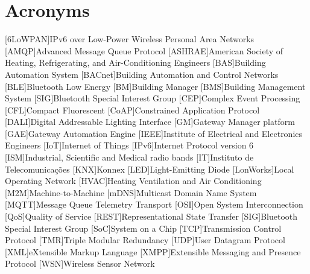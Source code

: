 \chapter{Acronyms}

\footnotesize
\SingleSpacing

\begin{multicols}{2}
\begin{acronym}[AAAAAA]
	[6LoWPAN]{IPv6 over Low-Power Wireless Personal Area Networks}
	[AMQP]{Advanced Message Queue Protocol}
	[ASHRAE]{American Society of Heating, Refrigerating, and Air-Conditioning Engineers}
	[BAS]{Building Automation System}
	[BACnet]{Building Automation and Control Networks}
	[BLE]{Bluetooth Low Energy}
	[BM]{Building Manager}
	[BMS]{Building Management System}
	[SIG]{Bluetooth Special Interest Group}
	[CEP]{Complex Event Processing}
	[CFL]{Compact Fluorescent}
	[CoAP]{Constrained Application Protocol}
	[DALI]{Digital Addressable Lighting Interface}
	[GM]{Gateway Manager platform}
	[GAE]{Gateway Automation Engine}
	[IEEE]{Institute of Electrical and Electronics Engineers}
	[IoT]{Internet of Things}
	[IPv6]{Internet Protocol version 6}
	[ISM]{Industrial, Scientific and Medical radio bands}
	[IT]{Instituto de Telecomunicações}
	[KNX]{Konnex}
	[LED]{Light-Emitting Diode}
	[LonWorks]{Local Operating Network}
	[HVAC]{Heating Ventilation and Air Conditioning}
	[M2M]{Machine-to-Machine}
	[mDNS]{Multicast Domain Name System}
	[MQTT]{Message Queue Telemetry Transport}
	[OSI]{Open System Interconnection}
	[QoS]{Quality of Service}
	[REST]{Representational State Transfer}
	[SIG]{Bluetooth Special Interest Group}
	[SoC]{System on a Chip}
	[TCP]{Transmission Control Protocol}
	[TMR]{Triple Modular Redundancy}
	[UDP]{User Datagram Protocol}
	[XML]{eXtensible Markup Language}
	[XMPP]{Extensible Messaging and Presence Protocol}
	[WSN]{Wireless Sensor Network}
	


\end{acronym}
\end{multicols}

